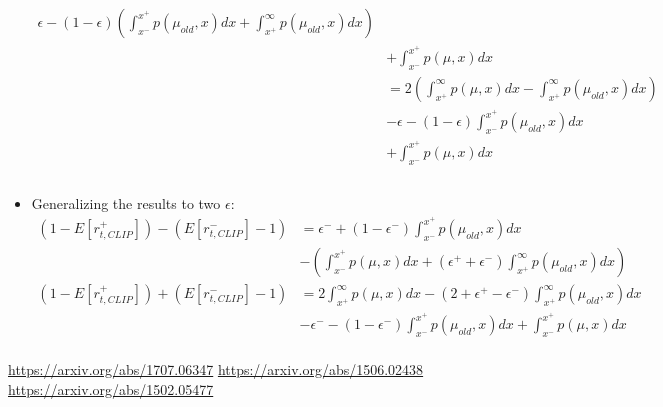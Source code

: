 \documentclass[a4paper]{article}
\begin{document}
\begin{itemize}
\begin{align*}
        \epsilon
        - 
        (1 - \epsilon)
        \left(
        \int_{x^{-}}^{x^{+}}p(\mu_{old}, x)dx
        +
        \int_{x^{+}}^{\infty}p(\mu_{old}, x)dx
        \right)\\
        &+ 
        \int_{x^{-}}^{x^{+}}p(\mu, x)dx \\
        &=
        2\left(\int_{x^{+}}^{\infty}
        p(\mu, x)
        dx -
        \int_{x^{+}}^{\infty}p(\mu_{old}, x)dx\right)\\
        &-
        \epsilon
        - 
        (1 - \epsilon)
        \int_{x^{-}}^{x^{+}}p(\mu_{old}, x)dx
        \\
        &+ 
        \int_{x^{-}}^{x^{+}}p(\mu, x)dx 
        \\
        \\
    \end{align*}
    
    \item Generalizing the results to two $\epsilon$:
    \begin{align*}
        (1 - E[r_{t, CLIP}^{+}]) - (E[r_{t, CLIP}^{-}] - 1)
        &=
        \epsilon^-
        + 
        (1 - \epsilon^-)
        \int_{x^{-}}^{x^{+}}p(\mu_{old}, x)dx
        \\
        &-\left(\int_{x^{-}}^{x^{+}}p(\mu, x)dx 
        +(\epsilon^+ + \epsilon^-)
        \int_{x^{+}}^{\infty}p(\mu_{old}, x)dx\right)\\
        (1 - E[r_{t, CLIP}^{+}]) + (E[r_{t, CLIP}^{-}] - 1)
        &=
        2\int_{x^{+}}^{\infty}
        p(\mu, x)
        dx -
        (2 + \epsilon^+ - \epsilon^-)
        \int_{x^{+}}^{\infty}p(\mu_{old}, x)dx\\
        &-
        \epsilon^-
        - 
        (1 - \epsilon^-)
        \int_{x^{-}}^{x^{+}}p(\mu_{old}, x)dx + 
        \int_{x^{-}}^{x^{+}}p(\mu, x)dx
        \\
    \end{align*}

\end{itemize}

%

\newpage
\begin{thebibliography}{9}
\url{https://arxiv.org/abs/1707.06347}
\url{https://arxiv.org/abs/1506.02438}
\url{https://arxiv.org/abs/1502.05477}
\end{thebibliography}
\end{document}
